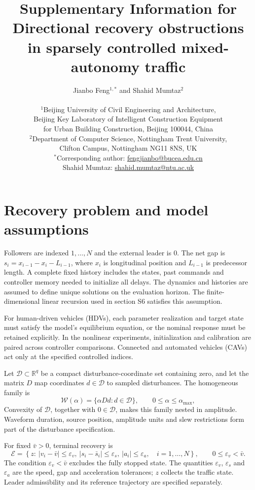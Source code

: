 \documentclass[11pt]{article}
\title{Supplementary Information for\\Directional recovery obstructions in sparsely controlled mixed-autonomy traffic}
\author{Jianbo Feng$^{1,*}$ and Shahid Mumtaz$^{2}$\\[0.4em]
\parbox{0.96\textwidth}{\centering\small
$^1$Beijing University of Civil Engineering and Architecture,\\
Beijing Key Laboratory of Intelligent Construction Equipment\\
for Urban Building Construction, Beijing 100044, China\\[0.25em]
$^2$Department of Computer Science, Nottingham Trent University,\\
Clifton Campus, Nottingham NG11 8NS, UK\\[0.35em]
$^*$Corresponding author: \href{mailto:fengjianbo@bucea.edu.cn}{fengjianbo@bucea.edu.cn}\\
Shahid Mumtaz: \href{mailto:shahid.mumtaz@ntu.ac.uk}{shahid.mumtaz@ntu.ac.uk}}}
\date{}
\begin{document}
\maketitle

\section{Recovery problem and model assumptions}\label{sec:problem}
Followers are indexed $1,\ldots,N$ and the external leader is 0. The net gap is $s_i=x_{i-1}-x_i-L_{i-1}$, where $x_i$ is longitudinal position and $L_{i-1}$ is predecessor length. A complete fixed history includes the states, past commands and controller memory needed to initialize all delays. The dynamics and histories are assumed to define unique solutions on the evaluation horizon. The finite-dimensional linear recursion used in section S6 satisfies this assumption.

For human-driven vehicles (HDVs), each parameter realization and target state must satisfy the model's equilibrium equation, or the nominal response must be retained explicitly. In the nonlinear experiments, initialization and calibration are paired across controller comparisons. Connected and automated vehicles (CAVs) act only at the specified controlled indices.

Let $\mathcal D\subset\mathbb R^q$ be a compact disturbance-coordinate set containing zero, and let the matrix $D$ map coordinates $d\in\mathcal D$ to sampled disturbances. The homogeneous family is
\begin{equation}
\mathcal W(\alpha)=\{\alpha Dd:d\in\mathcal D\},\qquad 0\leq\alpha\leq\alpha_{\max},
\label{eq:family}
\end{equation}
Convexity of $\mathcal D$, together with $0\in\mathcal D$, makes this family nested in amplitude. Waveform duration, source position, amplitude units and slew restrictions form part of the disturbance specification.

For fixed $\bar v>0$, terminal recovery is
\begin{equation}
\mathcal E=\left\{z:\ |v_i-\bar v|\leq\varepsilon_v,\
|s_i-\bar s_i|\leq\varepsilon_s,\ |a_i|\leq\varepsilon_a,\quad i=1,\ldots,N\right\},
\qquad 0\leq\varepsilon_v<\bar v.
\label{eq:terminal}
\end{equation}
The condition $\varepsilon_v<\bar v$ excludes the fully stopped state. The quantities $\varepsilon_v$, $\varepsilon_s$ and $\varepsilon_a$ are the speed, gap and acceleration tolerances; $z$ collects the traffic state. Leader admissibility and its reference trajectory are specified separately.
\end{document}
